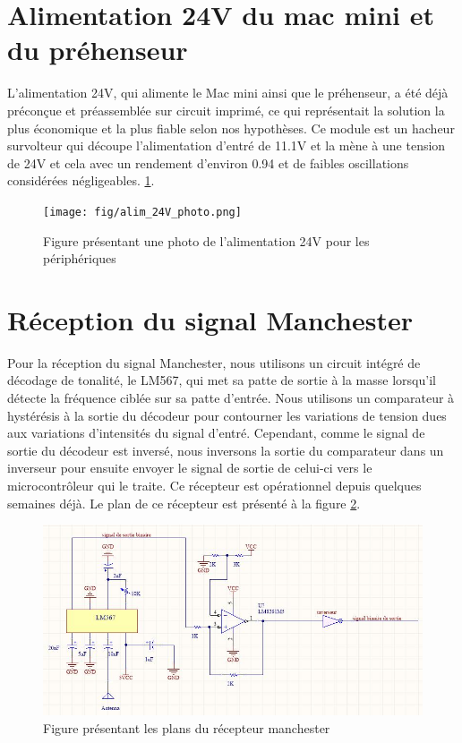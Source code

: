 \section{Alimentation 24V du mac mini et du préhenseur}
L’alimentation 24V, qui alimente le Mac mini ainsi que le préhenseur, a été déjà préconçue et préassemblée sur circuit imprimé, ce qui représentait la solution la plus économique et la plus fiable selon nos hypothèses. Ce module est un hacheur survolteur qui découpe l’alimentation d’entré de 11.1V et la mène à une tension de 24V et cela avec un rendement d’environ 0.94 et de faibles oscillations considérées négligeables. \ref{fig:alim24Vphoto}.

\begin{figure}[htbp]
\centering
\texttt{[image: fig/alim\_24V\_photo.png]}
\caption{Figure présentant une photo de l'alimentation 24V pour les périphériques}
\label{fig:alim24Vphoto}
\end{figure}

\section{Réception du signal Manchester}
Pour la réception du signal Manchester, nous utilisons un circuit intégré de décodage de tonalité, le LM567, qui met sa patte de sortie à la masse lorsqu’il détecte la fréquence ciblée sur sa patte d’entrée. Nous utilisons un comparateur à hystérésis à la sortie du décodeur pour contourner les variations de tension dues aux variations d’intensités du signal d’entré. Cependant, comme le signal de sortie du décodeur est inversé, nous inversons la sortie du comparateur dans un inverseur pour ensuite envoyer le signal de sortie de celui-ci vers le microcontrôleur qui le traite. Ce récepteur est opérationnel depuis quelques semaines déjà. Le plan de ce récepteur est présenté à la figure \ref{fig:manchester}.

\begin{figure}[htbp]
\centering
\includegraphics[scale=0.5]{fig/circuit_manchester.jpg}
\caption{Figure présentant les plans du récepteur manchester}
\label{fig:manchester}
\end{figure}

